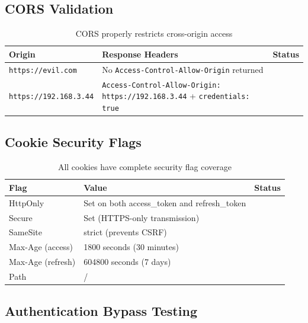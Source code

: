 \documentclass[12pt,a4paper]{article}
\newcommand{\pass}{\textcolor{success}{\checkmark}}
\begin{document}
\subsection{CORS Validation}

\begin{table}[H]
\centering
\begin{tabularx}{\textwidth}{lXc}
\toprule
\textbf{Origin} & \textbf{Response Headers} & \textbf{Status} \\
\midrule
\texttt{https://evil.com} & No \texttt{Access-Control-Allow-Origin} returned & \pass \\
\texttt{https://192.168.3.44} & \texttt{Access-Control-Allow-Origin: https://192.168.3.44} + \texttt{credentials: true} & \pass \\
\bottomrule
\end{tabularx}
\caption{CORS properly restricts cross-origin access}
\end{table}

\subsection{Cookie Security Flags}

\begin{table}[H]
\centering
\begin{tabular}{llc}
\toprule
\textbf{Flag} & \textbf{Value} & \textbf{Status} \\
\midrule
HttpOnly & Set on both access\_token and refresh\_token & \pass \\
Secure & Set (HTTPS-only transmission) & \pass \\
SameSite & strict (prevents CSRF) & \pass \\
Max-Age (access) & 1800 seconds (30 minutes) & \pass \\
Max-Age (refresh) & 604800 seconds (7 days) & \pass \\
Path & / & \pass \\
\bottomrule
\end{tabular}
\caption{All cookies have complete security flag coverage}
\end{table}

\subsection{Authentication Bypass Testing}
\end{document}
